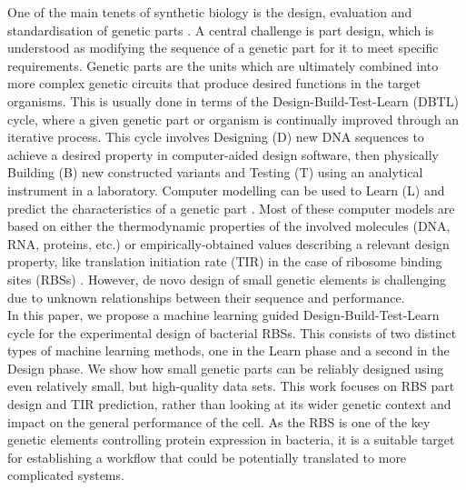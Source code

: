 \documentclass{scrartcl}[2013/05/29]%
\begin{document}
One of the main tenets of synthetic biology is the design, evaluation and standardisation of genetic parts \cite{Brophy2014,Canton2008,Stanton2014}.
A central challenge is part design, which is understood as modifying the sequence of a genetic part for it to meet specific requirements.
Genetic parts are the units which are ultimately combined into more complex genetic circuits that produce desired functions in the target organisms.
This is usually done in terms of the Design-Build-Test-Learn (DBTL) cycle, where a given genetic part or organism is continually improved through an iterative process.
This cycle involves Designing (D) new DNA sequences to achieve a desired property in computer-aided design software, then physically Building (B) new constructed variants and Testing (T) using an analytical instrument in a laboratory.
Computer modelling can be used to Learn (L) and predict the characteristics of a genetic part \cite{Yeoh2019,Nielsen2016}.
Most of these computer models are based on either the thermodynamic properties of the involved molecules (DNA, RNA, proteins, etc.) or empirically-obtained values describing a relevant design property, like translation initiation rate (TIR) in the case of ribosome binding sites (RBSs) \cite{Xia1998,Chen2013,Reeve2014}.
However, de novo design of small genetic elements is challenging due to unknown relationships between their sequence and performance.\\

In this paper, we propose a machine learning guided Design-Build-Test-Learn cycle
for the experimental design of bacterial RBSs. This consists of two distinct
types of machine learning methods, one in the Learn phase and a second in the
Design phase.
We show how small genetic parts can be reliably designed using even relatively small, but high-quality data sets.
This work focuses on RBS part design and TIR prediction, rather than looking at its wider genetic context and impact on the general performance of the cell.
As the RBS is one of the key genetic elements controlling protein expression in bacteria,
it is a suitable target for establishing a workflow that could be potentially translated to more complicated systems.\\
\end{document}
